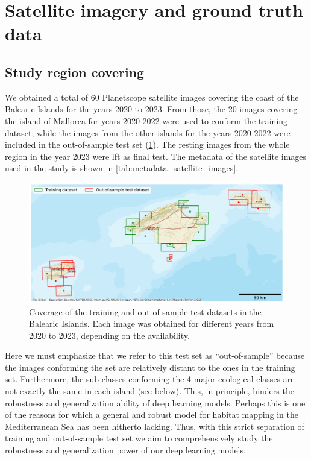 \section{Satellite imagery and ground truth data}\label{app:satellite_imagery}

\subsection{Study region covering}

We obtained a total of 60 Planetscope satellite images covering the
coast of the Balearic Islands for the years 2020 to 2023. From those, the 20
images covering the island of Mallorca for years 2020-2022 were used to conform
the training
dataset, while the images from the other islands for the years 2020-2022 were
included in the
out-of-sample test set (\cref{fig:images-dataset}). The resting images from the
whole region in the year 2023 were lft as final test. The metadata of the
satellite images used in the study is shown in
\cref{tab:metadata_satellite_images}.

\begin{figure}[H]
    \centering
    \includegraphics[width=\textwidth]{Figures/Images_used.pdf}
    \caption{Coverage of the training and out-of-sample test datasets in
        the Balearic Islands. Each image was obtained for different years
        from 2020 to 2023, depending on the availability.}
    \label{fig:images-dataset}
\end{figure}

Here we must emphasize that we refer to this test set as
``out-of-sample'' because the images conforming the set are relatively distant
to the ones in the training set. Furthermore, the sub-classes conforming the 4
major ecological classes are not exactly the same in each island (see below).
This, in principle, hinders the robustness and generalization ability of deep
learning models. Perhaps this is one of the reasons for which a general and
robust model for habitat mapping in the Mediterranean Sea has been hitherto
lacking. Thus, with this strict separation of training and out-of-sample test
set we aim to comprehensively study the robustness and generalization power of
our deep learning models.

